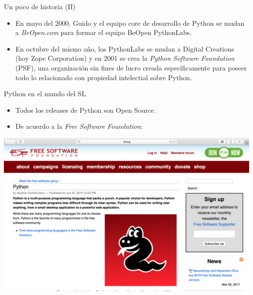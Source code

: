 \documentclass[usenames,dvipsnames]{beamer}
\begin{document}
  \begin{frame}{Un poco de historia (II)}
    \begin{itemize}
      \item En mayo del 2000, Guido y el equipo core de desarrollo de Python
      se mudan a \textit{BeOpen.com} para formar el equipo {BeOpen PythonLabs}.

      \item En octubre del mismo año, los PythonLabs se mudan a Digital Creations
      (hoy Zope Corporation) y en 2001 se crea la \textit{Python Software Foundation}
      (PSF), una organización sin fines de lucro creada específicamente para
      poseer todo lo relacionado con propiedad intelectial sobre Python.
    \end{itemize}
  \end{frame}

  \begin{frame}{Python en el mundo del SL}
    \begin{itemize}
      \item Todos los releases de Python son Open Source.
      \item De acuerdo a la \textit{Free Software Foundation}:
    \end{itemize}
    \begin{center}
      \begin{tcolorbox}[beamer,
                  width=1.065\textheight,
                  arc=0pt,
                  boxsep=0pt,
                  left=0pt,right=0pt,top=0pt,bottom=0pt,
                  ]
        \includegraphics[scale=0.2]{imgs/fsf}
      \end{tcolorbox}
    \end{center}
  \end{frame}
\end{document}
